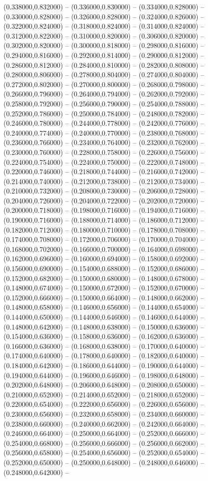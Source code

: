 (0.338000,0.832000) -- (0.336000,0.830000) -- (0.334000,0.828000) -- (0.330000,0.828000) -- (0.326000,0.828000) -- (0.324000,0.826000) -- (0.322000,0.824000) -- (0.318000,0.824000) -- (0.314000,0.824000) -- (0.312000,0.822000) -- (0.310000,0.820000) -- (0.306000,0.820000) -- (0.302000,0.820000) -- (0.300000,0.818000) -- (0.298000,0.816000) -- (0.294000,0.816000) -- (0.292000,0.814000) -- (0.290000,0.812000) -- (0.286000,0.812000) -- (0.284000,0.810000) -- (0.282000,0.808000) -- (0.280000,0.806000) -- (0.278000,0.804000) -- (0.274000,0.804000) -- (0.272000,0.802000) -- (0.270000,0.800000) -- (0.268000,0.798000) -- (0.266000,0.796000) -- (0.264000,0.794000) -- (0.262000,0.792000) -- (0.258000,0.792000) -- (0.256000,0.790000) -- (0.254000,0.788000) -- (0.252000,0.786000) -- (0.250000,0.784000) -- (0.248000,0.782000) -- (0.246000,0.780000) -- (0.244000,0.778000) -- (0.242000,0.776000) -- (0.240000,0.774000) -- (0.240000,0.770000) -- (0.238000,0.768000) -- (0.236000,0.766000) -- (0.234000,0.764000) -- (0.232000,0.762000) -- (0.230000,0.760000) -- (0.228000,0.758000) -- (0.226000,0.756000) -- (0.224000,0.754000) -- (0.224000,0.750000) -- (0.222000,0.748000) -- (0.220000,0.746000) -- (0.218000,0.744000) -- (0.216000,0.742000) -- (0.214000,0.740000) -- (0.212000,0.738000) -- (0.212000,0.734000) -- (0.210000,0.732000) -- (0.208000,0.730000) -- (0.206000,0.728000) -- (0.204000,0.726000) -- (0.204000,0.722000) -- (0.202000,0.720000) -- (0.200000,0.718000) -- (0.198000,0.716000) -- (0.194000,0.716000) -- (0.190000,0.716000) -- (0.188000,0.714000) -- (0.186000,0.712000) -- (0.182000,0.712000) -- (0.180000,0.710000) -- (0.178000,0.708000) -- (0.174000,0.708000) -- (0.172000,0.706000) -- (0.170000,0.704000) -- (0.168000,0.702000) -- (0.166000,0.700000) -- (0.164000,0.698000) -- (0.162000,0.696000) -- (0.160000,0.694000) -- (0.158000,0.692000) -- (0.156000,0.690000) -- (0.154000,0.688000) -- (0.152000,0.686000) -- (0.152000,0.682000) -- (0.150000,0.680000) -- (0.148000,0.678000) -- (0.148000,0.674000) -- (0.150000,0.672000) -- (0.152000,0.670000) -- (0.152000,0.666000) -- (0.150000,0.664000) -- (0.148000,0.662000) -- (0.148000,0.658000) -- (0.146000,0.656000) -- (0.144000,0.654000) -- (0.144000,0.650000) -- (0.144000,0.646000) -- (0.146000,0.644000) -- (0.148000,0.642000) -- (0.148000,0.638000) -- (0.150000,0.636000) -- (0.154000,0.636000) -- (0.158000,0.636000) -- (0.162000,0.636000) -- (0.166000,0.636000) -- (0.168000,0.638000) -- (0.170000,0.640000) -- (0.174000,0.640000) -- (0.178000,0.640000) -- (0.182000,0.640000) -- (0.184000,0.642000) -- (0.186000,0.644000) -- (0.190000,0.644000) -- (0.194000,0.644000) -- (0.196000,0.646000) -- (0.198000,0.648000) -- (0.202000,0.648000) -- (0.206000,0.648000) -- (0.208000,0.650000) -- (0.210000,0.652000) -- (0.214000,0.652000) -- (0.218000,0.652000) -- (0.220000,0.654000) -- (0.222000,0.656000) -- (0.226000,0.656000) -- (0.230000,0.656000) -- (0.232000,0.658000) -- (0.234000,0.660000) -- (0.238000,0.660000) -- (0.240000,0.662000) -- (0.242000,0.664000) -- (0.246000,0.664000) -- (0.250000,0.664000) -- (0.252000,0.666000) -- (0.254000,0.668000) -- (0.256000,0.666000) -- (0.256000,0.662000) -- (0.256000,0.658000) -- (0.254000,0.656000) -- (0.252000,0.654000) -- (0.252000,0.650000) -- (0.250000,0.648000) -- (0.248000,0.646000) -- (0.248000,0.642000) -- 